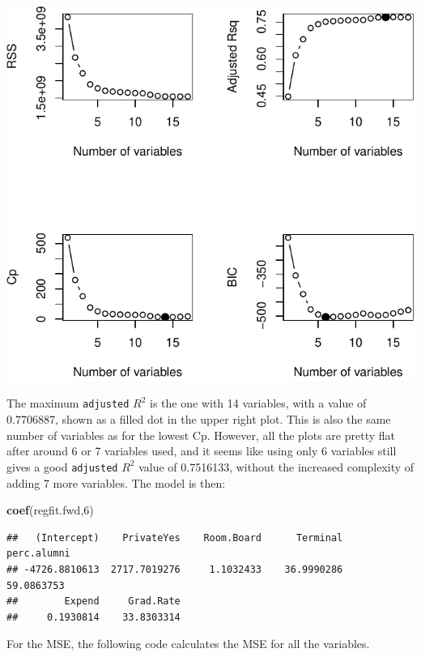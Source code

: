 \documentclass[]{article}
\newenvironment{Shaded}{\begin{snugshade}}{\end{snugshade}}
\newcommand{\DecValTok}[1]{\textcolor[rgb]{0.00,0.00,0.81}{#1}}
\newcommand{\KeywordTok}[1]{\textcolor[rgb]{0.13,0.29,0.53}{\textbf{#1}}}
\newcommand{\NormalTok}[1]{#1}
\begin{document}
\begin{center}\includegraphics{Compulsory2_Group37_StatLearn_files/figure-latex/p2d3-1} \end{center}

The maximum \texttt{adjusted} \(R^2\) is the one with 14 variables, with
a value of 0.7706887, shown as a filled dot in the upper right plot.
This is also the same number of variables as for the lowest Cp. However,
all the plots are pretty flat after around 6 or 7 variables used, and it
seems like using only 6 variables still gives a good \texttt{adjusted}
\(R^2\) value of 0.7516133, without the increased complexity of adding 7
more variables. The model is then:

\begin{Shaded}
\begin{Highlighting}[]
\KeywordTok{coef}\NormalTok{(regfit.fwd,}\DecValTok{6}\NormalTok{)}
\end{Highlighting}
\end{Shaded}

\begin{verbatim}
##   (Intercept)    PrivateYes    Room.Board      Terminal   perc.alumni 
## -4726.8810613  2717.7019276     1.1032433    36.9990286    59.0863753 
##        Expend     Grad.Rate 
##     0.1930814    33.8303314
\end{verbatim}

For the MSE, the following code calculates the MSE for all the
variables.
\end{document}
